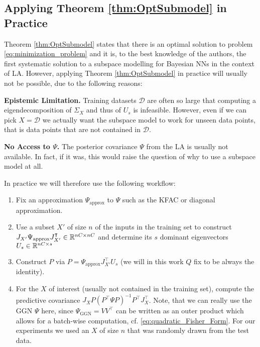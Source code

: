 \subsection{Applying Theorem \ref{thm:OptSubmodel} in Practice}
\label{sec:thm_in_practice}

Theorem \ref{thm:OptSubmodel} states that there is an optimal solution to problem \eqref{eq:minimization_problem} and it is, to the best knowledge of the authors, the first systematic solution to a subspace modelling for Bayesian NNs in the context of LA. 
However, applying Theorem \ref{thm:OptSubmodel} in practice will usually not be possible, due to the following reasons:

\textbf{Epistemic Limitation.} Training datasets $\mathcal{D}$ are often so large that computing a eigendecomposition of $\Sigma_X$ and thus of $U_s$ is infeasible. However, even if we can pick $X=\mathcal{D}$ we actually want the subspace model to work for unseen data points, that is data points that are not contained in $\mathcal{D}$.

\textbf{No Access to $\Psi$.} The posterior covariance $\Psi$ from the LA is usually not available. In fact, if it was, this would raise the question of why to use a subspace model at all.

In practice we will therefore use the following workflow:
\begin{enumerate}
    \item Fix an approximation $\Psi_{\mathrm{approx}}$ to $\Psi$ such as the KFAC or diagonal approximation.
    \item Use a subset $X'$ of size $n$ of the inputs in the training set to construct $J_{X'} \Psi_{\mathrm{approx}} J_{X'}^\intercal \in \mathbb{R}^{nC\times nC}$ and determine its $s$ dominant eigenvectors $U_s\in \mathbb{R}^{nC \times s}$
    \item Construct $P$ via $P=\Psi_{\mathrm{approx}} J_{X'}^\intercal U_s$ (we will in this work $Q$ fix to be always the identity).
    \item For the $X$ of interest (usually not contained in the training set), compute the predictive covariance $J_X P (P^\intercal \Psi P)^{-1} P^\intercal J_X^\intercal$. Note, that we can really use the GGN $\Psi$ here, since $\Psi_{\mathrm{GGN}}=VV^\intercal$ can be written as an outer product which allows for a batch-wise computation, cf. \eqref{eq:quadratic_Fisher_Form}. For our experiments we used an $X$ of size $n$ that was randomly drawn from the test data.
\end{enumerate}

